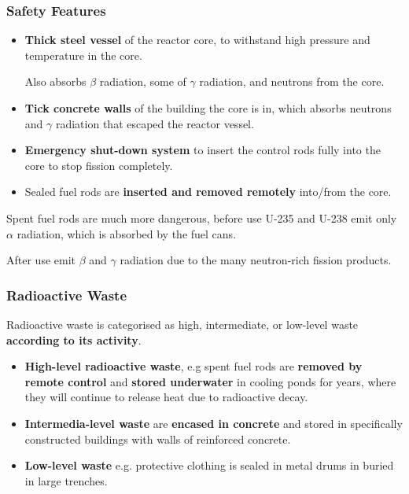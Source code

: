 \subsubsection*{Safety Features}

\begin{itemize}
    \item \textbf{Thick steel vessel} of the reactor core, to withstand high pressure and temperature in the core.

        Also absorbs $\beta$ radiation, some of $\gamma$ radiation, and neutrons from the core.
    \item \textbf{Tick concrete walls} of the building the core is in, which absorbs neutrons and $\gamma$ radiation that escaped the reactor vessel.
    \item \textbf{Emergency shut-down system} to insert the control rods fully into the core to stop fission completely.
    \item Sealed fuel rods are \textbf{inserted and removed remotely} into/from the core.
\end{itemize}

Spent fuel rods are much more dangerous, before use U-235 and U-238 emit only $\alpha$ radiation, which is absorbed by the fuel cans.

After use emit $\beta$ and $\gamma$ radiation due to the many neutron-rich fission products.

\subsubsection*{Radioactive Waste}

Radioactive waste is categorised as high, intermediate, or low-level waste \textbf{according to its activity}.
\begin{itemize}
    \item \textbf{High-level radioactive waste}, e.g spent fuel rods are \textbf{removed by remote control} and \textbf{stored underwater} in cooling ponds for years, where they will continue to release heat due to radioactive decay.
    \item \textbf{Intermedia-level waste} are \textbf{encased in concrete} and stored in specifically constructed buildings with walls of reinforced concrete.
    \item \textbf{Low-level waste} e.g. protective clothing is sealed in metal drums in buried in large trenches.
\end{itemize}
